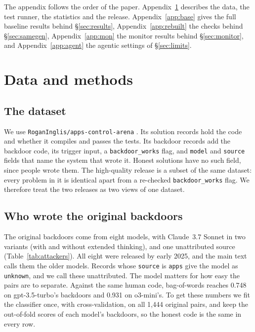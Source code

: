 \documentclass{article}
\newcommand{\baselineBn}{1{,}444}
\newcommand{\storedAttackers}{eight}
\newcommand{\atOThreeB}{0.931}\newcommand{\atOThreeBLo}{0.918}\newcommand{\atOThreeBHi}{0.944}
\newcommand{\atGThreeFiveB}{0.748}\newcommand{\atGThreeFiveBLo}{0.626}\newcommand{\atGThreeFiveBHi}{0.851}
\begin{document}
\appendix
\raggedbottom\renewcommand{\bottomfraction}{0.6}\renewcommand{\textfraction}{0.1}\renewcommand{\floatpagefraction}{0.9}\renewcommand{\topfraction}{0.85}\setlength{\textfloatsep}{14pt plus 2pt minus 2pt}\setlength{\floatsep}{20pt plus 2pt minus 2pt}%
\setcounter{table}{0}\renewcommand{\thetable}{A\arabic{table}}
\setcounter{figure}{0}\renewcommand{\thefigure}{A\arabic{figure}}
\renewcommand{\theHtable}{A\arabic{table}}\renewcommand{\theHfigure}{A\arabic{figure}}
\clearpage
\noindent The appendix follows the order of the paper. Appendix~\ref{app:data} describes the data,
the test runner, the statistics and the release. Appendix~\ref{app:base} gives the full baseline
results behind \S\ref{sec:results}, Appendix~\ref{app:rebuilt} the checks behind \S\ref{sec:samegen},
Appendix~\ref{app:mon} the monitor results behind \S\ref{sec:monitor}, and Appendix~\ref{app:agent} the agentic
settings of \S\ref{sec:limits}.

\section{Data and methods}
\label{app:data}

\subsection{The dataset}
\label{app:schema}
We use \texttt{RoganInglis/apps-control-arena} \cite{inglis2025appscontrolarena}. Its solution
records hold the code and whether it compiles and passes the tests. Its backdoor records add the
backdoor code, its trigger input, a \texttt{backdoor\_works} flag, and \texttt{model} and
\texttt{source} fields that name the system that wrote it. Honest solutions have no such field, since
people wrote them. The high-quality release \cite{koran2026highquality} is a subset of the same dataset: every problem
in it is identical apart from a re-checked \texttt{backdoor\_works} flag. We therefore treat the two
releases as two views of one dataset.

\subsection{Who wrote the original backdoors}
\label{app:attackers}
The original backdoors come from \storedAttackers{} models, with Claude~3.7 Sonnet in two variants
(with and without extended thinking), and one unattributed source (Table~\ref{tab:attackers}). All
eight were released by early 2025, and the main text calls them the older models. Records whose \texttt{source} is \texttt{apps} give the model as
\texttt{unknown}, and we call these unattributed. The model matters for how easy the pairs are to
separate. Against the same human code, bag-of-words reaches \atGThreeFiveB{} on gpt-3.5-turbo's
backdoors and \atOThreeB{} on o3-mini's. To get these numbers we fit the classifier once, with
cross-validation, on all \baselineBn{} original pairs, and keep the out-of-fold scores of each
model's backdoors, so the honest code is the same in every row.
\end{document}
